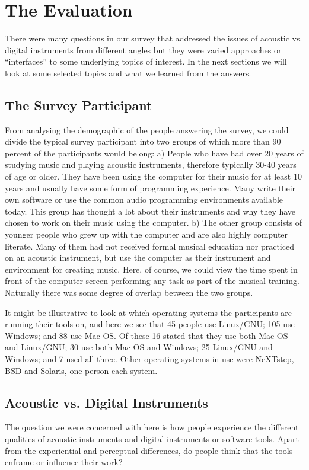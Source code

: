 \section{The Evaluation}
There were many questions in our survey that addressed the issues of acoustic
vs. digital instruments from different angles but they were varied approaches or
``interfaces'' to some underlying topics of interest. In the next sections we
will look at some selected topics and what we learned from the answers.

\subsection{The Survey Participant}
From analysing the demographic of the people answering the survey, we could
divide the typical survey participant into two groups of which more than 90
percent of the participants would belong: a) People who have had over 20 years of
studying music and playing acoustic instruments, therefore typically 30-40 years
of age or older. They have been using the computer for their music for at least
10 years and usually have some form of programming experience. Many write their
own software or use the common audio programming environments available today.
This group has thought a lot about their instruments and why they have chosen to
work on their music using the computer. b) The other group consists of younger
people who grew up with the computer and are also highly computer literate. Many
of them had not received formal musical education nor practiced on an acoustic
instrument, but use the computer as their instrument and environment for creating
music. Here, of course, we could view the time spent in front of the computer
screen performing any task as part of the musical training. Naturally there was
some degree of overlap between the two groups.

It might be illustrative to look at which operating systems the participants are
running their tools on, and here we see that 45 people use Linux/GNU; 105 use
Windows; and 88 use Mac OS. Of these 16 stated that they use both Mac OS and
Linux/GNU; 30 use both Mac OS and Windows; 25 Linux/GNU and Windows; and 7 used
all three. Other operating systems in use were NeXTstep, BSD and Solaris, one
person each system.

\subsection{Acoustic vs. Digital Instruments}
The question we were concerned with here is how people experience the different
qualities of acoustic instruments and digital instruments or software tools.
Apart from the experiential and perceptual differences, do people think that the
tools enframe or influence their work?

